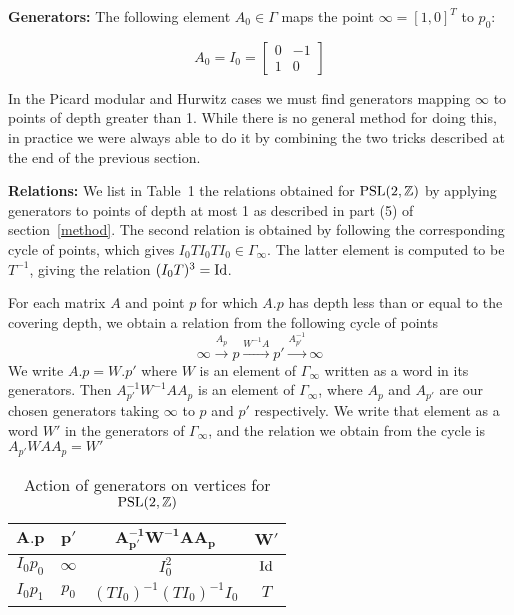 \documentclass{article}[12pt]
\newcommand{\Z}{\mathbb{Z}}
\begin{document}
{\bf Generators:} 
The following element $A_0 \in \Gamma$ maps the point $\infty=[1,0]^T$ to $p_0$:

$$A_0=I_0=\left[ \begin{array}{cc}
0 & -1 \\
1 & 0
\end{array}\right]
$$

In the Picard modular and Hurwitz cases we must find generators mapping $\infty$ to points of depth greater than 1.  While there is no general method for doing this, in practice we were always able to do it by combining the two tricks described at the end of the previous section.

{\bf Relations:} 
We list in Table~1 the relations obtained for $\rm{PSL}(2,\Z)$ by applying generators to points of depth at most 1 as described in part (5) of section~\ref{method}. The second relation is obtained by following the corresponding cycle of points, which gives $I_0TI_0TI_0 \in \Gamma_\infty$. The latter element is computed to be $T^{-1}$, giving the relation $(I_0T)^3={\rm Id}$.

For each matrix $A$ and point $p$ for which $A.p$ has depth less than or equal to the covering depth, we obtain a relation from the following cycle of points
$$\infty \xrightarrow{A_p} p \xrightarrow{W^{-1} A} p' \xrightarrow{A_{p'}^{-1}}  \infty$$
We write $A.p = W.p'$ where $W$ is an element of $\Gamma_\infty$ written as a word in its generators.  Then $A_{p'}^{-1}W^{-1}A A_p$ is an element of $\Gamma_\infty$, where $A_p$ and $A_{p'}$ are our chosen generators taking $\infty$ to $p$ and $p'$ respectively.  We write that element as a word $W'$ in the generators of $\Gamma_\infty$, and the relation we obtain from the cycle is $A_{p'}WA A_p = W'$


\begin{table}[h]\label{SL2table}
  \begin{center}
  {\renewcommand{\arraystretch}{1.2}%
\begin{tabular}{|c|c|c|c|}
\hline 
$\mathbf{A.p}$ & $\mathbf{p'}$ & $\mathbf{A_{p'}^{-1}W^{-1}A A_p}$ & $\mathbf{W'}$  \\
\hline
$I_0 p_0$ & $\infty$ & $I_0^2$ & ${\rm Id}$\\
\hline
$I_0  p_1$ & $p_0$ & $(TI_0)^{-1}(TI_0)^{-1}I_0$ & $T$\\
\hline
\end{tabular}
}
\end{center}
\caption{Action of generators on vertices for ${\rm PSL}(2,\Z)$}
\end{table}
\end{document}
